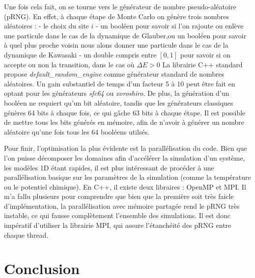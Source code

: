     Une fois cela fait, on se tourne vers le générateur de nombre pseudo-aléatoire (pRNG). En effet, à chaque étape de Monte Carlo on génère trois nombres aléatoires : 
    - le choix du site $i$
    - un booléen pour savoir si l'on rajoute ou enlève une particule dans le cas de la dynamique de Glauber,ou  un booléen pour savoir à quel plus proche voisin nous alons donner une particule dans le cas de la dynamique de Kawasaki
    - un double compris entre $[0,1]$ pour savoir si on accepte ou non la transition, dans le cas où $\Delta E \greater 0$
	La librairie C++ standard propose \textit{default\_random\_engine} comme générateur standard de nombres aléatoires. Un gain substantiel de temps d'un facteur 5 à 10 peut être fait en optant pour les générateurs \textit{sfc64} ou \textit{xoroshiro}. De plus, la génération d'un booléen ne requiert qu'un bit aléatoire, tandis que les générateurs classiques génères 64 bits à chaque fois, ce qui gâche 63 bits à chaque étape. Il est possible de mettre tous les bits générés en mémoire, afin de n'avoir à générer un nombre aléatoire qu'une fois tous les 64 booléens utilsés\cite{martin_ankerl_fast_nodate}.

    Pour finir, l'optimisation la plus évidente est la parallélisation du code. Bien que l'on puisse décomposer les domaines afin d'accélérer la simulation d'un système, les modèles 1D étant rapides, il est plus intéressant de procéder à une parallélisation basique sur les paramètres de la simulation (comme la température ou le potentiel chimique). En C++, il existe deux libraires : OpenMP et MPI. Il m'a fallu plusieurs pour comprendre que bien que la première soit très faicle d'implémentation, la parallélisation avec mémoire partagée rend le pRNG très instable, ce qui fausse complètement l'ensemble des simulations. Il est donc impératif d'utiliser la librairie MPI, qui assure l'étanchéité des pRNG entre chaque thread.
		
\section{Conclusion}

